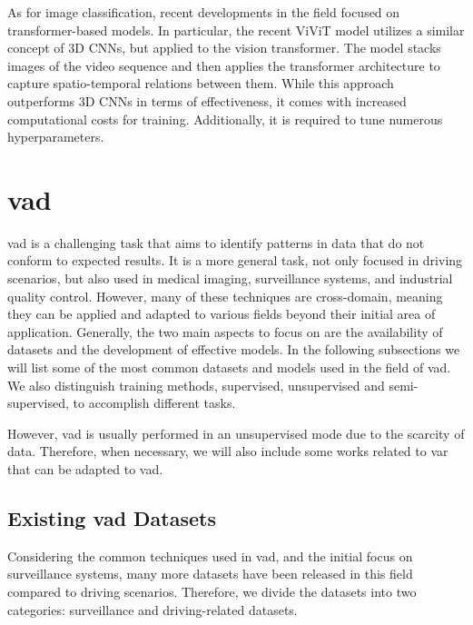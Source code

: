 As for image classification, recent developments in the field focused on 
transformer-based models. In particular, the recent ViViT model \cite{vivit} 
utilizes a similar concept of 3D CNNs, but applied to the vision transformer. 
The model stacks images of the video sequence and then applies the transformer 
architecture to capture spatio-temporal relations between them. 
While this approach outperforms 3D CNNs in terms of effectiveness, it comes with 
increased computational costs for training. Additionally, it is required to 
tune numerous hyperparameters.

\section{\acl{vad}}
\ac{vad} is a challenging task that aims to 
identify patterns in data that do not conform to expected results. It is a 
more general task, not only focused in driving scenarios, but also used in 
medical imaging, surveillance systems, and industrial quality control.
However, many of these techniques are cross-domain, meaning they can be applied and 
adapted to various fields beyond their initial area of application.
Generally, the two main aspects to focus on are the availability 
of datasets and the development of effective models. In the following subsections
we will list some of the most common datasets and models used in the field of 
\ac{vad}. We also distinguish training methods, supervised, unsupervised and 
semi-supervised, to accomplish different tasks.

However, \ac{vad} is usually performed in an unsupervised mode due to the 
scarcity of data. Therefore, when necessary, we will also include some works 
related to \ac{var} that can be adapted to \ac{vad}.

\subsection{Existing \acs{vad} Datasets}
Considering the common techniques used in \ac{vad}, and the initial focus 
on surveillance systems, many more datasets have been released in this field 
compared to driving scenarios. Therefore, we divide the datasets into 
two categories: surveillance and driving-related datasets.

